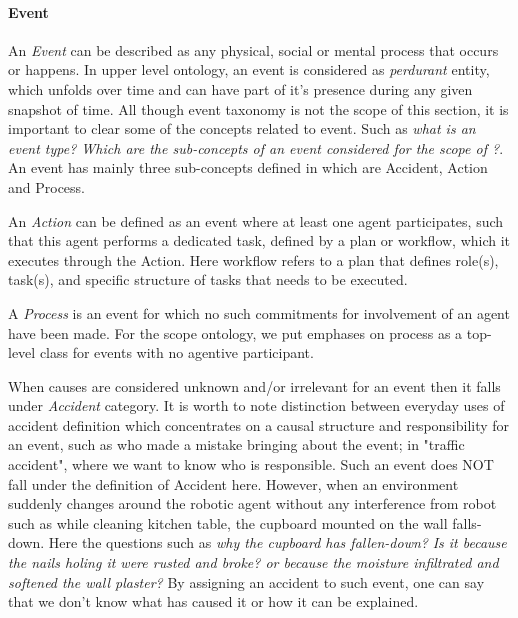  
\paragraph{Event}
An \emph{Event} can be described as any physical, social or mental process that occurs or happens. In \dul upper level ontology, an event is considered as \emph{perdurant} entity, which unfolds over time and can have part of it's presence during any given snapshot of time. All though event taxonomy is not the scope of this section, it is important to clear some of the concepts related to event. Such as \emph{what is an event type? Which are the sub-concepts of an event considered for the scope of \neemnar?}. An event has mainly three sub-concepts defined in \soma which are Accident, Action and Process.

An  \emph{Action} can be defined as an event where at least one agent participates, such that this agent performs a dedicated task, defined by a plan or workflow, which it executes through the Action. Here workflow refers to a plan that defines role(s), task(s), and specific structure of tasks that needs to be executed. 

A \emph{Process} is an event for which no such commitments for involvement of an agent have been made. For the scope \soma ontology, we put emphases on process as a top-level class for events with no agentive participant. %

When causes are considered unknown and/or irrelevant for an event then it falls under \emph{Accident} category. It is worth to note distinction between everyday uses of accident definition which concentrates on a causal structure and responsibility for an event, such as who made a mistake bringing about the event; in "traffic accident", where we want to know who is responsible. Such an event does NOT fall under the definition of Accident here. However, when an environment suddenly changes around the robotic agent without any interference from robot such as while cleaning kitchen table, the cupboard mounted on the wall falls-down. Here the questions such as \textit{why the cupboard has fallen-down?} \textit{Is it because the nails holing it were rusted and broke? or because the moisture infiltrated and softened the wall plaster?} By assigning an accident to such event, one can say that we don't know what has caused it or how it can be explained.

